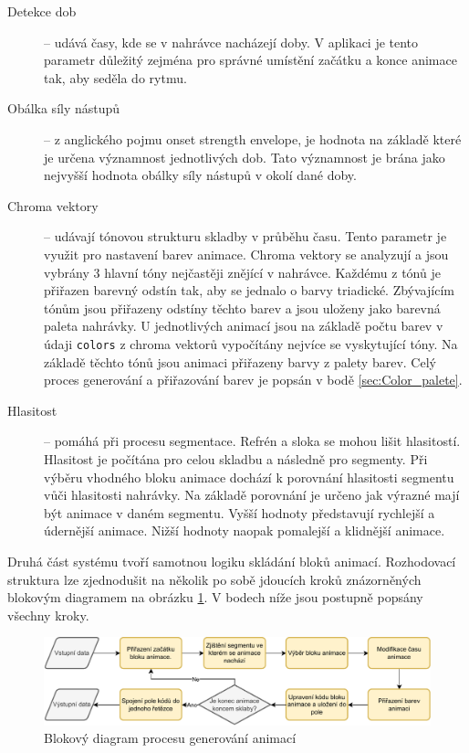 \begin{description}
    \item[Detekce dob] -- udává časy, kde se v nahrávce nacházejí doby. V aplikaci je tento parametr důležitý zejména pro správné umístění začátku a konce animace tak, aby seděla do rytmu. 

    \item[Obálka síly nástupů] -- z anglického pojmu onset strength envelope, je hodnota na základě které je určena významnost jednotlivých dob. Tato významnost je brána jako nejvyšší hodnota obálky síly nástupů v okolí dané doby.
     
    \item[Chroma vektory] -- udávají tónovou strukturu skladby v průběhu času. Tento parametr je využit pro nastavení barev animace. Chroma vektory se analyzují a jsou vybrány 3 hlavní tóny nejčastěji znějící v nahrávce. Každému z tónů je přiřazen barevný odstín tak, aby se jednalo o barvy triadické. Zbývajícím tónům jsou přiřazeny odstíny těchto barev a jsou uloženy jako barevná paleta nahrávky. U jednotlivých animací jsou na základě počtu barev v údaji \texttt{colors} z chroma vektorů vypočítány nejvíce se vyskytující tóny. Na základě těchto tónů jsou animaci přiřazeny barvy z palety barev. Celý proces generování a přiřazování barev je popsán v bodě \ref{sec:Color_palete}.

    \item[Hlasitost] -- pomáhá při procesu segmentace. Refrén a sloka se mohou lišit hlasitostí. Hlasitost je počítána pro celou skladbu a následně pro segmenty. Při výběru vhodného bloku animace dochází k porovnání hlasitosti segmentu vůči hlasitosti nahrávky. Na základě porovnání je určeno jak výrazné mají být animace v daném segmentu. Vyšší hodnoty představují rychlejší a údernější animace. Nižší hodnoty naopak pomalejší a klidnější animace.
\end{description}


Druhá část systému tvoří samotnou logiku skládání bloků animací. Rozhodovací struktura lze zjednodušit na několik po sobě jdoucích kroků znázorněných blokovým diagramem na obrázku \ref{fig:diagram_procesu_generovani_animaci}. V bodech níže jsou postupně popsány všechny kroky.

\begin{figure}[H]
    \centering
    \includegraphics[width = 1\linewidth]{obrazky/UML_diagramy_anim_generation_process.pdf}
    \caption{Blokový diagram procesu generování animací}
    \label{fig:diagram_procesu_generovani_animaci}
\end{figure}

